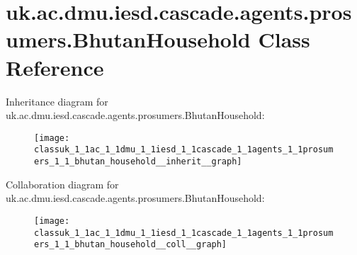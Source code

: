 \hypertarget{classuk_1_1ac_1_1dmu_1_1iesd_1_1cascade_1_1agents_1_1prosumers_1_1_bhutan_household}{\section{uk.\-ac.\-dmu.\-iesd.\-cascade.\-agents.\-prosumers.\-Bhutan\-Household Class Reference}
\label{classuk_1_1ac_1_1dmu_1_1iesd_1_1cascade_1_1agents_1_1prosumers_1_1_bhutan_household}
}


Inheritance diagram for uk.\-ac.\-dmu.\-iesd.\-cascade.\-agents.\-prosumers.\-Bhutan\-Household\-:\nopagebreak
\begin{figure}[H]
\begin{center}
\leavevmode
\texttt{[image: classuk\_1\_1ac\_1\_1dmu\_1\_1iesd\_1\_1cascade\_1\_1agents\_1\_1prosumers\_1\_1\_bhutan\_household\_\_inherit\_\_graph]}
\end{center}
\end{figure}


Collaboration diagram for uk.\-ac.\-dmu.\-iesd.\-cascade.\-agents.\-prosumers.\-Bhutan\-Household\-:\nopagebreak
\begin{figure}[H]
\begin{center}
\leavevmode
\texttt{[image: classuk\_1\_1ac\_1\_1dmu\_1\_1iesd\_1\_1cascade\_1\_1agents\_1\_1prosumers\_1\_1\_bhutan\_household\_\_coll\_\_graph]}
\end{center}
\end{figure}
